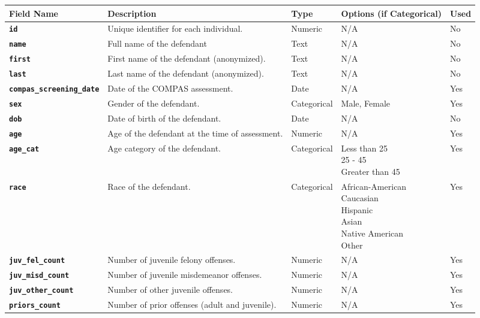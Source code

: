 \documentclass[conference]{IEEEtran}
\begin{document}
	\begin{table}[!ht]
	\centering
	\begin{tabular}{|l|l|l|l|l|}
		\hline
		Field Name	&	Description	&	Type	&	Options (if Categorical)	&	Used \\ \hline\hline
		\textbf{\texttt{id}}	&	Unique identifier for each individual.	&	Numeric	&	N/A	&	No \\ \hline
		\textbf{\texttt{name}}	&	Full name of the defendant	&	Text	&	N/A	&	No \\ \hline
		\textbf{\texttt{first}}	&	First name of the defendant (anonymized).	&	Text	&	N/A	&	No \\ \hline
		\textbf{\texttt{last}}	&	Last name of the defendant (anonymized).	&	Text	&	N/A	&	No \\ \hline
		\textbf{\texttt{compas\_screening\_date}}	&	Date of the COMPAS assessment.	&	Date	&	N/A	&	Yes \\ \hline
		\textbf{\texttt{sex}}	&	Gender of the defendant.	&	Categorical	&	Male, Female	&	Yes \\ \hline
		\textbf{\texttt{dob}}	&	Date of birth of the defendant.	&	Date	&	N/A	&	No \\ \hline
		\textbf{\texttt{age}}	&	Age of the defendant at the time of assessment.	&	Numeric	&	N/A	&	Yes \\ \hline
		\textbf{\texttt{age\_cat}}	&	Age category of the defendant.	&	Categorical	&	\makecell[l]{Less than 25\\25 - 45\\Greater than 45}	&	Yes \\ \hline
		\textbf{\texttt{race}}	&	Race of the defendant.	&	Categorical	&	\makecell[l]{African-American\\Caucasian\\Hispanic\\Asian\\Native American\\Other}	&	Yes \\ \hline
		\textbf{\texttt{juv\_fel\_count}}	&	Number of juvenile felony offenses.	&	Numeric	&	N/A	&	Yes \\ \hline
		\textbf{\texttt{juv\_misd\_count}}	&	Number of juvenile misdemeanor offenses.	&	Numeric	&	N/A	&	Yes \\ \hline
		\textbf{\texttt{juv\_other\_count}}	&	Number of other juvenile offenses.	&	Numeric	&	N/A	&	Yes \\ \hline
		\textbf{\texttt{priors\_count}}	&	Number of prior offenses (adult and juvenile).	&	Numeric	&	N/A	&	Yes \\ \hline

\end{tabular}
\end{table}
\end{document}
